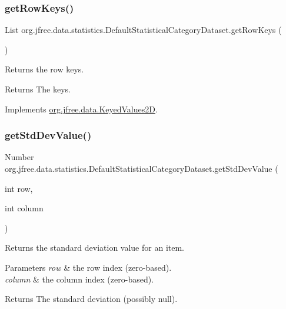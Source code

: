 \subsubsection{\texorpdfstring{get\+Row\+Keys()}{getRowKeys()}}
{\footnotesize\ttfamily List org.\+jfree.\+data.\+statistics.\+Default\+Statistical\+Category\+Dataset.\+get\+Row\+Keys (\begin{DoxyParamCaption}{ }\end{DoxyParamCaption})}

Returns the row keys.

\begin{DoxyReturn}{Returns}
The keys. 
\end{DoxyReturn}


Implements \mbox{\hyperlink{interfaceorg_1_1jfree_1_1data_1_1_keyed_values2_d_aeda9aab284e61f69ca6e81370e76f70a}{org.\+jfree.\+data.\+Keyed\+Values2D}}.

\mbox{\label{classorg_1_1jfree_1_1data_1_1statistics_1_1_default_statistical_category_dataset_a09ad7dd078ff3965d5a7f66a86e8dcbc}} 
\subsubsection{\texorpdfstring{get\+Std\+Dev\+Value()}{getStdDevValue()}\hspace{0.1cm}{\footnotesize\ttfamily [1/2]}}
{\footnotesize\ttfamily Number org.\+jfree.\+data.\+statistics.\+Default\+Statistical\+Category\+Dataset.\+get\+Std\+Dev\+Value (\begin{DoxyParamCaption}\item[{int}]{row,  }\item[{int}]{column }\end{DoxyParamCaption})}

Returns the standard deviation value for an item.


\begin{DoxyParams}{Parameters}
{\em row} & the row index (zero-\/based). \\
\hline
{\em column} & the column index (zero-\/based).\\
\hline
\end{DoxyParams}
\begin{DoxyReturn}{Returns}
The standard deviation (possibly {\ttfamily null}). 
\end{DoxyReturn}


